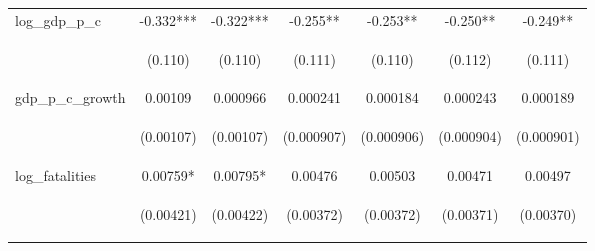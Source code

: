 \documentclass{article}
\begin{document}
\begin{table}[htbp]
{\begin{tabular}{lcccccc}
log\_gdp\_p\_c & -0.332*** & -0.322*** & -0.255** & -0.253** & -0.250** & -0.249** \\
\vspace{4pt} & \begin{footnotesize}(0.110)\end{footnotesize} & \begin{footnotesize}(0.110)\end{footnotesize} & \begin{footnotesize}(0.111)\end{footnotesize} & \begin{footnotesize}(0.110)\end{footnotesize} & \begin{footnotesize}(0.112)\end{footnotesize} & \begin{footnotesize}(0.111)\end{footnotesize} \\
gdp\_p\_c\_growth & 0.00109 & 0.000966 & 0.000241 & 0.000184 & 0.000243 & 0.000189 \\
\vspace{4pt} & \begin{footnotesize}(0.00107)\end{footnotesize} & \begin{footnotesize}(0.00107)\end{footnotesize} & \begin{footnotesize}(0.000907)\end{footnotesize} & \begin{footnotesize}(0.000906)\end{footnotesize} & \begin{footnotesize}(0.000904)\end{footnotesize} & \begin{footnotesize}(0.000901)\end{footnotesize} \\
log\_fatalities & 0.00759* & 0.00795* & 0.00476 & 0.00503 & 0.00471 & 0.00497 \\
\vspace{4pt} & \begin{footnotesize}(0.00421)\end{footnotesize} & \begin{footnotesize}(0.00422)\end{footnotesize} & \begin{footnotesize}(0.00372)\end{footnotesize} & \begin{footnotesize}(0.00372)\end{footnotesize} & \begin{footnotesize}(0.00371)\end{footnotesize} & \begin{footnotesize}(0.00370)\end{footnotesize} \\

\end{tabular}}
\end{table}
\end{document}
